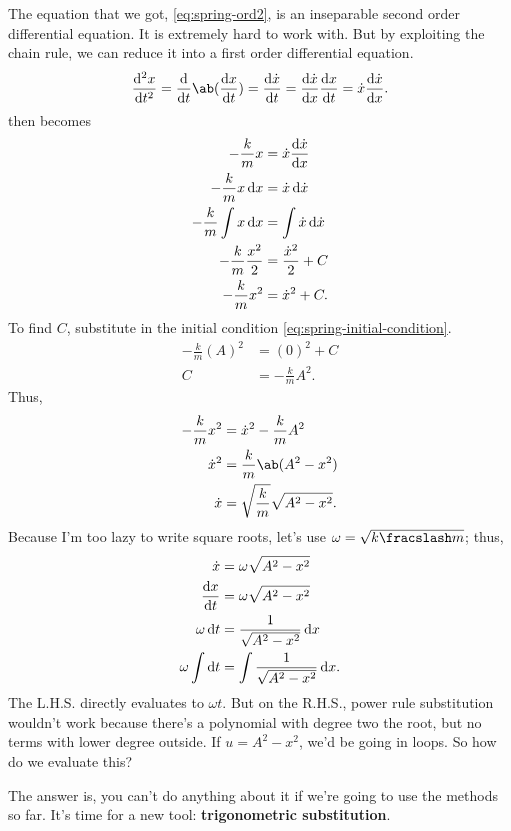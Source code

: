 The equation that we got, \cref{eq:spring-ord2}, is an inseparable second order differential equation. It is extremely hard to work with. But by exploiting the chain rule, we can reduce it into a first order differential equation.
\begin{equation}
	\odv[ord = 2]{x}{t} = \odv*{\ab(\odv{x}{t})}{t} = \odv{\dot{x}}{t} = \odv{\dot{x}}{x}\odv{x}{t} = \dot{x}\odv{\dot{x}}{x}.
\end{equation}
 then becomes
\begin{align}
	-\frac{k}{m}x &= \dot{x}\odv{\dot{x}}{x} \\
	-\frac{k}{m}x\odif{x} &= \dot{x}\odif{\dot{x}} \\
	-\frac{k}{m}\int x\odif{x} &= \int\dot{x}\odif{\dot{x}} \\
	-\frac{k}{m}\frac{x^2}{2} &= \frac{\dot{x}^2}{2} + C \\
	-\frac{k}{m}x^2 &= \dot{x}^2 + C.
\end{align}
To find $C$, substitute in the initial condition \cref{eq:spring-initial-condition}.
\begin{align}
	-\frac{k}{m}(A)^2 &= (0)^2 + C \\
	C &= -\frac{k}{m}A^2. 
\end{align}
Thus,
\begin{align}
	-\frac{k}{m}x^2 &= \dot{x}^2 - \frac{k}{m}A^2 \\
	\dot{x}^2 &= \frac{k}{m}\ab(A^2 - x^2) \\
	\dot{x} &= \sqrt{\frac{k}{m}}\sqrt{A^2 - x^2}.
\end{align}
Because I'm too lazy to write square roots, let's use $\omega = \sqrt{\flatfrac{k}{m}}$; thus,
\begin{align}
	\dot{x} &= \omega\sqrt{A^2 - x^2} \\
	\odv{x}{t} &= \omega\sqrt{A^2 - x^2} \\
	\omega\odif{t} &= \frac{1}{\sqrt{A^2 - x^2}}\odif{x} \\
	\omega\int\odif{t} &= \int\frac{1}{\sqrt{A^2 - x^2}}\odif{x}. \label{eq:spring-ord1-d}
\end{align}
The L.H.S. directly evaluates to $\omega t$. But on the R.H.S., power rule substitution wouldn't work because there's a polynomial with degree two the root, but no terms with lower degree outside. If $u = A^2 - x^2$, we'd be going in loops. So how do we evaluate this?

The answer is, you can't do anything about it if we're going to use the methods so far. It's time for a new tool: \textbf{trigonometric substitution}.

